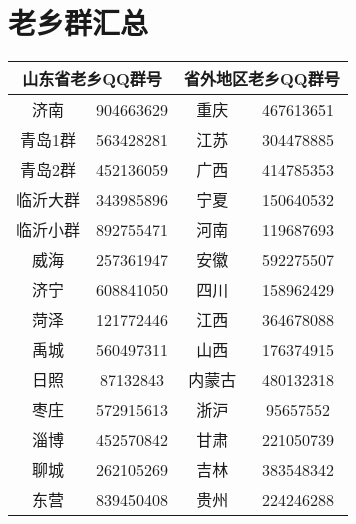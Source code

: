\chapter[老乡群汇总]{老乡群汇总}
\begin{table}[!ht]
    \centering
    \begin{tabular}{|c|c|c|c|}
        \multicolumn{2}{|c|}{山东省老乡QQ群号} & \multicolumn{2}{c|}{省外地区老乡QQ群号}                           \\ \hline
        济南                              & 904663629                       & 重庆         & 467613651  \\ \hline
        青岛1群                            & 563428281                       & 江苏         & 304478885  \\ \hline
        青岛2群                            & 452136059                       & 广西         & 414785353  \\ \hline
        临沂大群                            & 343985896                       & 宁夏         & 150640532  \\ \hline
        临沂小群                            & 892755471                       & 河南         & 119687693  \\ \hline
        威海                              & 257361947                       & 安徽         & 592275507  \\ \hline
        济宁                              & 608841050                       & 四川         & 158962429  \\ \hline
        菏泽                              & 121772446                       & 江西         & 364678088  \\ \hline
        禹城                              & 560497311                       & 山西         & 176374915  \\ \hline
        日照                              & 87132843                        & 内蒙古        & 480132318  \\ \hline
        枣庄                              & 572915613                       & 浙沪         & 95657552   \\ \hline
        淄博                              & 452570842                       & 甘肃         & 221050739  \\ \hline
        聊城                              & 262105269                       & 吉林         & 383548342  \\ \hline
        东营                              & 839450408                       & 贵州         & 224246288  \\ \hline

\end{tabular}
\end{table}
